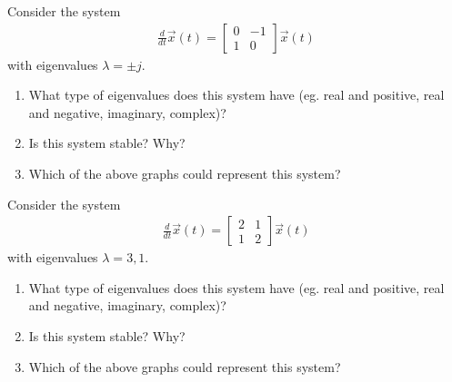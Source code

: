 \begin{enumerate}
    \qitem Consider the system
    \begin{align*}
        \frac{d}{dt} \vec{x}(t) = \begin{bmatrix}
            0 & -1 \\
            1 & 0
        \end{bmatrix} \vec{x}(t)
    \end{align*}
    with eigenvalues $\lambda = \pm j$.
    \begin{enumerate}
        \item What type of eigenvalues does this system have (eg. real and positive, real and negative, imaginary, complex)?
        \item Is this system stable? Why?
        \item Which of the above graphs could represent this system?
    \end{enumerate}

    \qitem Consider the system
    \begin{align*}
        \frac{d}{dt} \vec{x}(t) = \begin{bmatrix}
            2 & 1 \\
            1 & 2
        \end{bmatrix} \vec{x}(t)
    \end{align*}
    with eigenvalues $\lambda = 3, 1$.
    \begin{enumerate}
        \item What type of eigenvalues does this system have (eg. real and positive, real and negative, imaginary, complex)?
        \item Is this system stable? Why?
        \item Which of the above graphs could represent this system?
    \end{enumerate}


\end{enumerate}
